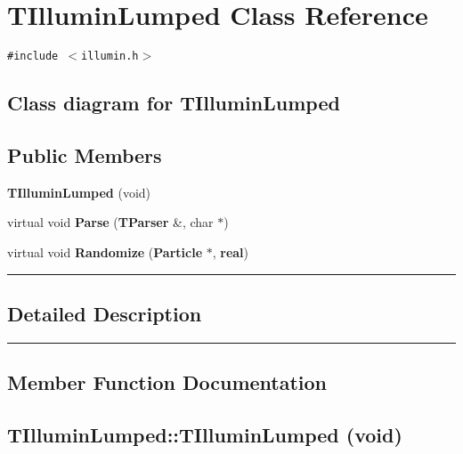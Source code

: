 \section{TIlluminLumped  Class Reference}
\label{TIlluminLumped}


{\tt \#include $<$illumin.h$>$}

\subsection*{Class diagram for TIlluminLumped}
\begin{figure}[H]
\begin{center}
\leavevmode
\setlength{\epsfysize}{2cm}
\end{center}
\end{figure}
\subsection*{Public Members}
\begin{CompactItemize}
\item 
{\bf TIllumin\-Lumped} (void)
\item 
virtual void {\bf Parse} ({\bf TParser} \&, char $\ast$)
\item 
virtual void {\bf Randomize} ({\bf Particle} $\ast$, {\bf real})
\end{CompactItemize}
\vspace{0.4cm}\hrule\vspace{0.2cm}
\subsection*{Detailed Description}
\vspace{0.4cm}\hrule\vspace{0.2cm}
\subsection*{Member Function Documentation}
\label{TIlluminLumped_a0}
\subsection{\setlength{\rightskip}{0pt plus 5cm}TIllumin\-Lumped::TIllumin\-Lumped (void)}

\label{TIlluminLumped_a1}
